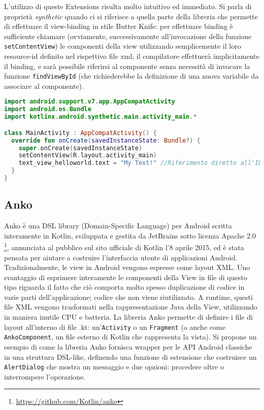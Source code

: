 L'utilizzo di queste Extensions risulta molto intuitivo ed immediato. Si parla di proprietà {\em synthetic} quando ci si riferisce a quella parte della libreria che permette di effettuare il view-binding in stile Butter Knife: per effettuare binding è sufficiente chiamare (ovviamente, successivamente all'invocazione della funzione \texttt{setContentView}) le componenti della view utilizzando semplicemente il loro resource-id definito nel rispettivo file xml; il compilatore effettuerà implicitamente il binding, e sarà possibile riferirsi al componente senza necessità di invocare la funzione \texttt{findViewById} (che richiederebbe la definizione di una nuova variabile da associare al componente).\\

\begin{lstlisting}[caption={Utilizzo delle proprietà synthetic di KAE}, captionpos=b, label={lst:exAmpleKAE}, language=Kotlin]
import android.support.v7.app.AppCompatActivity
import android.os.Bundle
import kotlinx.android.synthetic.main.activity_main.*

class MainActivity : AppCompatActivity() {
  override fun onCreate(savedInstanceState: Bundle?) {
    super.onCreate(savedInstanceState)
    setContentView(R.layout.activity_main)
    text_view_helloworld.text = "My Text!" //Riferimento diretto all'ID xml
  }
}
\end{lstlisting}

\subsection{Anko}
Anko è una DSL library (Domain-Specific Language) per Android scritta interamente in Kotlin, sviluppata e gestita da JetBrains sotto licenza Apache 2.0 \footnote{\url{https://github.com/Kotlin/anko}}, annunciata al pubblico sul sito ufficiale di Kotlin l'8 aprile 2015, ed è stata pensata per aiutare a costruire l'interfaccia utente di applicazioni Android.\\
Tradizionalmente, le view in Android vengono espresse come layout XML. Uno svantaggio di esprimere interamente le componenti della View in file di questo tipo riguarda il fatto che ciò comporta molto spesso duplicazione di codice in varie parti dell'applicazione; codice che non viene riutilizzato. A runtime, questi file XML vengono trasformati nella rappresentazione Java della View, utilizzando in maniera inutile CPU e batteria. La libreria Anko permette di definire i file di layout all'interno di file .kt: un'\texttt{Activity} o un \texttt{Fragment} (o anche come \texttt{AnkoComponent}, un file esterno di Kotlin che rappresenta la vista). Si propone un esempio di come la libreria Anko fornisca wrapper per le API Android classiche in una struttura DSL-like, definendo una funzione di estensione che costruisce un \texttt{AlertDialog} che mostra un messaggio e due opzioni: procedere oltre o interrompere l'operazione.\\

